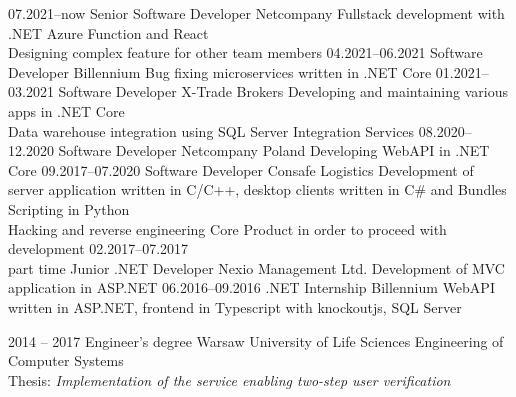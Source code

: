 \documentclass[9pt]{developercv} %
\begin{document}
\begin{entrylist}
	\entry
		{07.2021--now}
		{Senior Software Developer}
		{Netcompany}
		{
		  Fullstack development with .NET Azure Function and React\\
		  Designing complex feature for other team members
		}
	\entry
		{04.2021--06.2021}
		{Software Developer}
		{Billennium}
		{
		  Bug fixing microservices written in .NET Core
		}
	\entry
		{01.2021--03.2021}
		{Software Developer}
		{X-Trade Brokers}
		{
		  Developing and maintaining various apps in .NET Core\\
		  Data warehouse integration using SQL Server Integration Services
		}
	\entry
		{08.2020--12.2020}
		{Software Developer}
		{Netcompany Poland}
		{
		  Developing WebAPI in .NET Core
		}
	\entry
		{09.2017--07.2020}
		{Software Developer}
		{Consafe Logistics}
		{
		  Development of server application written in C/C++, desktop clients written in C\# and Bundles\\
		  Scripting in Python\\
		  Hacking and reverse engineering Core Product in order to proceed with development
		}
	\entry
		{02.2017--07.2017\\\footnotesize{part time}}
		{Junior .NET Developer}
		{Nexio Management Ltd.}
		{
		  Development of MVC application in ASP.NET
		}
	\entry
		{06.2016--09.2016}
		{.NET Internship}
		{Billennium}
		{
		  WebAPI written in ASP.NET, frontend in Typescript with knockoutjs, SQL Server
		}

\end{entrylist}



\begin{entrylist}
	\entry
		{2014 -- 2017}
		{Engineer’s degree}
		{Warsaw University of Life Sciences}
		{
			Engineering of Computer Systems\\
			Thesis: \it{Implementation of the service enabling two-step user verification}
		}
\end{entrylist}

\end{document}
